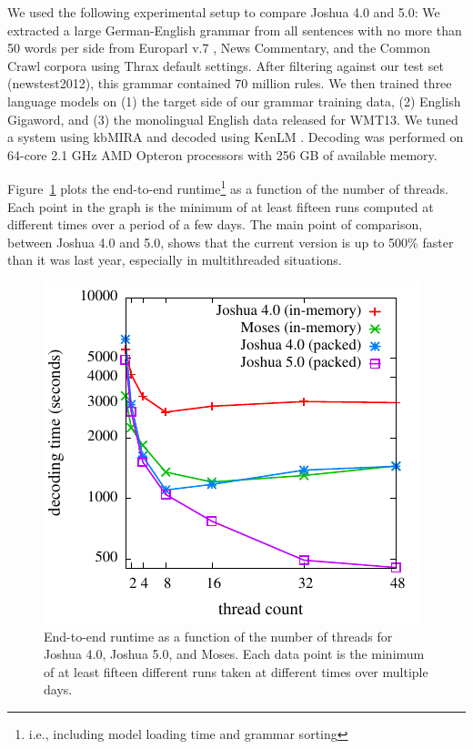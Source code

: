 \documentclass[11pt]{article}
\begin{document}
We used the following experimental setup to compare Joshua 4.0 and
5.0: We extracted a large German-English grammar from all sentences
with no more than 50 words per side from Europarl v.7
\cite{koehn2005europarl}, News Commentary, and the Common Crawl
corpora using Thrax default settings.  After filtering against our
test set (newstest2012), this grammar contained 70 million rules.  We
then trained three language models on (1) the target side of our
grammar training data, (2) English Gigaword, and (3) the monolingual
English data released for WMT13. We tuned a system using kbMIRA and
decoded using KenLM \cite{KenLM}.  Decoding was performed on 64-core
2.1 GHz AMD Opteron processors with 256 GB of available memory.

Figure~\ref{fig:cmp} plots the end-to-end runtime\footnote{i.e.,
  including model loading time and grammar sorting} as a function of
the number of threads.  Each point in the graph is the minimum of at
least fifteen runs computed at different times over a period of a few
days.  The main point of comparison, between Joshua 4.0 and 5.0, shows
that the current version is up to 500\% faster than it was last year,
especially in multithreaded situations.

\begin{figure}[!t]
  \begin{center}
    \includegraphics[width=0.99\linewidth]{plots/runtimes.pdf}
  \end{center}
  \caption{End-to-end runtime as a function of the number of threads
    for Joshua 4.0, Joshua 5.0, and Moses. Each data point is the
    minimum of at least fifteen different runs taken at different
    times over multiple days.}
  \label{fig:cmp}
\end{figure}
\end{document}
